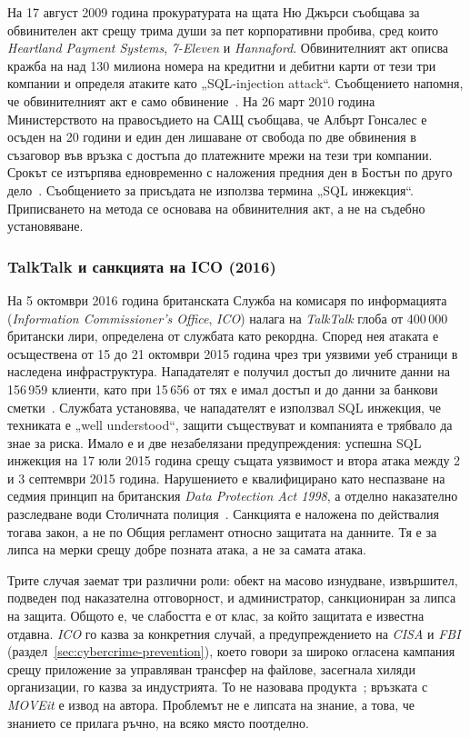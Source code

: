 На 17 август 2009 година прокуратурата на щата Ню Джърси съобщава за обвинителен
акт срещу трима души за пет корпоративни пробива, сред които \textit{Heartland
Payment Systems}, \textit{7-Eleven} и \textit{Hannaford}. Обвинителният акт описва
кражба на над 130 милиона номера на кредитни и дебитни карти от тези три компании и
определя атаките като „SQL-injection attack“. Съобщението напомня, че
обвинителният акт е само обвинение~\cite{doj_gonzalez_indictment_2009}. На 26 март
2010 година Министерството на правосъдието на САЩ съобщава, че Албърт Гонсалес е
осъден на 20 години и един ден лишаване от свобода по две обвинения в съзаговор
във връзка с достъпа до платежните мрежи на тези три компании. Срокът се
изтърпява едновременно с наложения предния ден в Бостън по друго
дело~\cite{doj_gonzalez_sentence_2010}. Съобщението за присъдата не използва
термина „SQL инжекция“. Приписването на метода се основава на обвинителния акт, а не
на съдебно установяване.

\subsubsection{TalkTalk и санкцията на ICO (2016)}

На 5 октомври 2016 година британската Служба на комисаря по информацията
(\textit{Information Commissioner's Office}, \textit{ICO}) налага на
\textit{TalkTalk} глоба от 400\,000 британски лири, определена от службата като
рекордна. Според нея атаката е осъществена от 15 до 21 октомври 2015 година чрез
три уязвими уеб страници в наследена инфраструктура. Нападателят е получил достъп до
личните данни на 156\,959 клиенти, като при 15\,656 от тях е имал достъп и до данни
за банкови сметки~\cite{ico_talktalk_2016}. Службата установява, че нападателят е
използвал SQL инжекция, че техниката е „well understood“, защити съществуват и
компанията е трябвало да знае за риска. Имало е и две незабелязани предупреждения:
успешна SQL инжекция на 17 юли 2015 година срещу същата уязвимост и втора атака
между 2 и 3 септември 2015 година. Нарушението е квалифицирано като неспазване на
седмия принцип на британския \textit{Data Protection Act 1998}, а отделно
наказателно разследване води Столичната полиция~\cite{ico_talktalk_2016}.
Санкцията е наложена по действалия тогава закон, а не по Общия регламент относно
защитата на данните. Тя е за липса на мерки срещу добре позната атака, а не за
самата атака.

Трите случая заемат три различни роли: обект на масово изнудване, извършител,
подведен под наказателна отговорност, и администратор, санкциониран за липса на
защита. Общото е, че слабостта е от клас, за който защитата е известна отдавна.
\textit{ICO} го казва за конкретния случай, а предупреждението на \textit{CISA} и
\textit{FBI} (раздел~\ref{sec:cybercrime-prevention}), което говори за широко огласена кампания срещу приложение за управляван трансфер на файлове, засегнала
хиляди организации, го казва за индустрията. То не назовава продукта~\cite{cisa_sqli_alert};
връзката с \textit{MOVEit} е извод на автора. Проблемът не е липсата на знание, а
това, че знанието се прилага ръчно, на всяко място поотделно.

